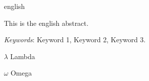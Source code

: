 \documentclass[
	12pt,				%
	openright,			%
	oneside,	
	a4paper,				%
	english,				%
	brazil				%
]{abntex2/abntex2} %
\begin{document}
\begin{resumo}[Abstract]
 \begin{otherlanguage*}{english}
 
   
   This is the english abstract.

   \vspace{\onelineskip}
 
   \noindent 
   \textit{Keywords}: Keyword 1, Keyword 2, Keyword 3.
 \end{otherlanguage*}
\end{resumo}

\listoffigures*
\cleardoublepage

\listoftables*
\cleardoublepage

\begin{simbolos}
  \item[$ \lambda $] Lambda
  \item[$ \omega $] Omega
\end{simbolos}

\tableofcontents*
\cleardoublepage

\textual










\postextual
{}


\end{document}
